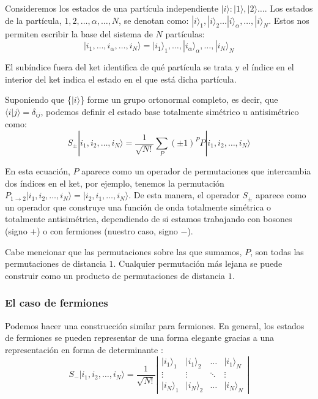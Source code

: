 \documentclass[12pt,twoside]{article}
\begin{document}
Consideremos los estados de una partícula independiente $|i\rangle : |1\rangle, |2\rangle \ldots$. Los estados de la partícula, $1, 2, \ldots, \alpha, \ldots, N$, se denotan como: $|i\rangle_1, |i\rangle_2 \ldots |i\rangle_{\alpha}, \ldots, |i\rangle_N$. Estos nos permiten escribir la base del sistema de $N$ partículas:
$$
|i_1, \ldots, i_{\alpha}, \ldots, i_N \rangle = |i_1\rangle_1, \ldots, |i_{\alpha} \rangle_{\alpha}, \ldots, |i_N\rangle_N
$$

El subíndice fuera del ket identifica de qué partícula se trata y el índice en el interior del ket indica el estado en el que está dicha partícula.

Suponiendo que \{$|i\rangle$\} forme un grupo ortonormal completo, es decir, que $\langle i|j \rangle = \delta_{ij}$, podemos definir el estado base totalmente simétrico u antisimétrico como:
\begin{equation}
S_{\pm} |i_1, i_2, \ldots, i_N \rangle = \frac{1}{\sqrt{N!}} \sum_P (\pm 1)^P P |i_1, i_2, \ldots, i_N \rangle
\end{equation}

En esta ecuación, $P$ aparece como un operador de permutaciones que intercambia dos índices en el ket, por ejemplo, tenemos la permutación $P_{1\to 2}|i_1, i_2, \ldots, i_N \rangle = |i_2, i_1, \ldots, i_N \rangle$. De esta manera, el operador $S_{\pm}$ aparece como un operador que construye una función de onda totalmente simétrica o totalmente antisimétrica, dependiendo de si estamos trabajando con bosones (signo $+$) o con fermiones (nuestro caso, signo $-$).

Cabe mencionar que las permutaciones sobre las que sumamos, $P$, son todas las permutaciones de distancia $1$. Cualquier permutación más lejana se puede construir como un producto de permutaciones de distancia $1$.
\subsubsection{El caso de fermiones}

Podemos hacer una construcción similar para fermiones. En general, los estados de fermiones se pueden representar de una forma elegante gracias a una representación en forma de determinante \cite{Sakurai_Napolitano_2020}:
\begin{equation}
  S_- |i_1, i_2, \ldots, i_N\rangle = \frac{1}{\sqrt{N!}} \left| \begin{array}{cccc}
  |i_1\rangle_1 & |i_1\rangle_2 & \ldots & |i_1\rangle_N \\
  \vdots & \vdots & \ddots & \vdots \\
  |i_N\rangle_1 & |i_N\rangle_2 & \ldots & |i_N\rangle_N
  \end{array} \right|
\end{equation}
\end{document}
